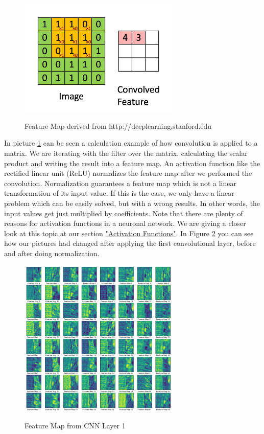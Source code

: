 \documentclass[journal]{IEEEtran}
\begin{document}
\begin{figure}
  \begin{center}
  \includegraphics[width=3in]{photo/cnn.png}\\
  \caption{Feature Map derived from http://deeplearning.stanford.edu}\label{featuremap}
  \end{center}
\end{figure}

In picture \ref{featuremap} can be seen a calculation example of how convolution is applied to a matrix. We are iterating with the filter over the matrix, calculating the scalar product and writing the result into a feature map. An activation function like the rectified linear unit (ReLU) normalizes the feature map after we performed the convolution. Normalization guarantees a feature map which is not a linear transformation of its input value. If this is the case, we only have a linear problem which can be easily solved, but with a wrong results. In other words, the input values get just multiplied by coefficients. Note that there are plenty of reasons for activation functions in a neuronal network. We are giving a closer look at this topic at our section \hyperref[sec:activationFunctions]{"Activation Functions"}. In Figure \ref{featuremap1} you can see how our pictures had changed after applying the first convolutional layer, before and after doing normalization.  \\

\begin{figure}
  \begin{center}
  \includegraphics[width=3in]{photo/feature_map1.png}\\
  \caption{Feature Map from CNN Layer 1}\label{featuremap1}
  \end{center}
\end{figure}
\end{document}
